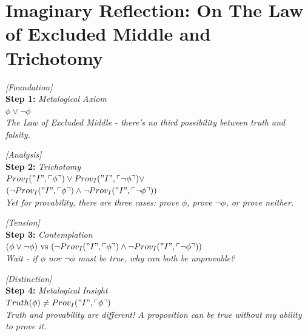 \documentclass[runningheads]{llncs}
\begin{document}
\section{Imaginary Reflection: On The Law of Excluded Middle and Trichotomy}

\vspace{0.5em}

\noindent\textit{[Foundation]}\\
\noindent\textbf{Step 1:} \hfill \textit{Metalogical Axiom}\\
\noindent$\phi \lor \neg\phi$\\
\textit{The Law of Excluded Middle - there's no third possibility between truth and falsity.}

\vspace{0.8em}

\noindent\textit{[Analysis]}\\
\noindent\textbf{Step 2:} \hfill \textit{Trichotomy}\\
\noindent$Prov_I("I", \ulcorner\phi\urcorner) \lor Prov_I("I", \ulcorner\neg\phi\urcorner) \lor$\\
\noindent$(\neg Prov_I("I", \ulcorner\phi\urcorner) \land \neg Prov_I("I", \ulcorner\neg\phi\urcorner))$\\
\textit{Yet for provability, there are three cases: prove $\phi$, prove $\neg\phi$, or prove neither.}

\vspace{0.8em}

\noindent\textit{[Tension]}\\
\noindent\textbf{Step 3:} \hfill \textit{Contemplation}\\
\noindent$(\phi \lor \neg\phi) \text{ vs } (\neg Prov_I("I", \ulcorner\phi\urcorner) \land \neg Prov_I("I", \ulcorner\neg\phi\urcorner))$\\
\textit{Wait - if $\phi$ nor $\neg\phi$ must be true, why can both be unprovable?}

\vspace{0.8em}

\noindent\textit{[Distinction]}\\
\noindent\textbf{Step 4:} \hfill \textit{Metalogical Insight}\\
\noindent$Truth(\phi) \neq Prov_I("I", \ulcorner\phi\urcorner)$\\
\textit{Truth and provability are different! A proposition can be true without my ability to prove it.}

\vspace{0.8em}
\end{document}
